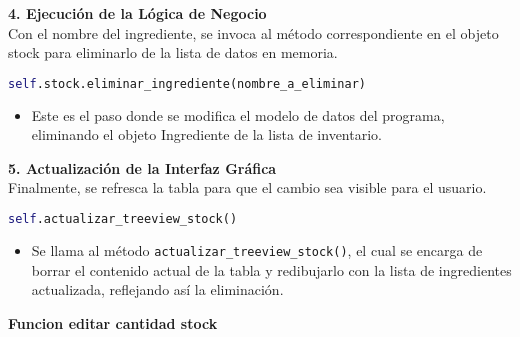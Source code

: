 \documentclass[a4paper,12pt]{article}
\begin{document}
\textbf{4. Ejecución de la Lógica de Negocio}\\
Con el nombre del ingrediente, se invoca al método correspondiente en el objeto stock para eliminarlo de la lista de datos en memoria.
\begin{lstlisting}[language=Python, caption={desenglosando codigo}, frame=single]
    self.stock.eliminar_ingrediente(nombre_a_eliminar)
\end{lstlisting}
\begin{itemize} 
\item Este es el paso donde se modifica el modelo de datos del programa, eliminando el objeto Ingrediente de la lista de inventario. 
\end{itemize}

\textbf{5. Actualización de la Interfaz Gráfica}\\
Finalmente, se refresca la tabla para que el cambio sea visible para el usuario.
\begin{lstlisting}[language=Python, caption={desenglosando codigo}, frame=single]
    self.actualizar_treeview_stock()
\end{lstlisting}
\begin{itemize} 
\item Se llama al método \verb|actualizar_treeview_stock()|, el cual se encarga de borrar el contenido actual de la tabla y redibujarlo con la lista de ingredientes actualizada, reflejando así la eliminación. 
\end{itemize}
\textbf{Funcion editar cantidad stock}
\end{document}

